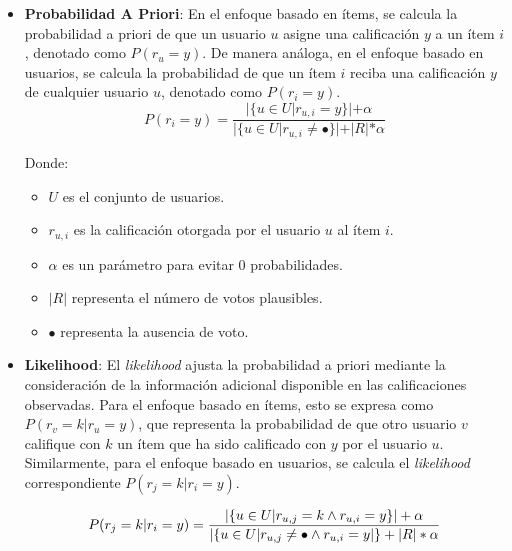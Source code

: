 \documentclass[runningheads,a4paper]{llncs}
\begin{document}
\begin{itemize}
    \item \textbf{Probabilidad A Priori}: 
    En el enfoque basado en ítems, se calcula la 
    probabilidad a priori de que un usuario $u$ asigne 
    una calificación $y$ a un ítem $i$, 
    denotado como $P(r_u = y)$. De manera análoga, 
    en el enfoque basado en usuarios, se calcula la 
    probabilidad de que un ítem $i$ reciba una 
    calificación $y$ de cualquier usuario $u$, 
    denotado como $P (r_i = y)$.\\

    \begin{equation}
        P(r_i = y) = \frac{|\{u \in U|r_{u,i} = y\}| + \alpha}{|\{u \in U|r_{u,i} \neq \bullet\}| + |R|*\alpha}
    \end{equation} \cite{tesis_sistema_recomendador_hibrido}

    Donde:
    \begin{itemize}
        \item $U$ es el conjunto de usuarios.
        \item $r_{u,i}$ es la calificación otorgada por el usuario $u$ al ítem $i$.
        \item $\alpha$ es un parámetro para evitar 0 probabilidades.
        \item $|R|$ representa el número de votos plausibles.
        \item $\bullet$ representa la ausencia de voto.
    \end{itemize} 

    
    \item \textbf{Likelihood}: 
    El \textit{likelihood} ajusta la probabilidad a 
    priori mediante la consideración de la 
    información adicional disponible en las 
    calificaciones observadas. Para el enfoque basado 
    en ítems, esto se expresa como 
    $P(r_v = k | r_u = y)$, que representa la 
    probabilidad de que otro usuario $v$ califique 
    con $k$ un ítem que ha sido calificado con $y$ 
    por el usuario $u$. Similarmente, para el enfoque 
    basado en usuarios, se calcula el \textit{likelihood} 
    correspondiente $P(r_j = k|r_i = y)$.

    \begin{equation}
        P(r_j = k|r_i = y) =  \\ \frac{|\{u \in U|r_{u,j} = k  \land  r_{u,i} = y\}|+ \alpha}{|\{u \in U|r_{u,j} \neq \bullet \land r_{u,i} = y|\} + |R|*\alpha}
    \end{equation} \cite{tesis_sistema_recomendador_hibrido}



\end{itemize}
\end{document}
